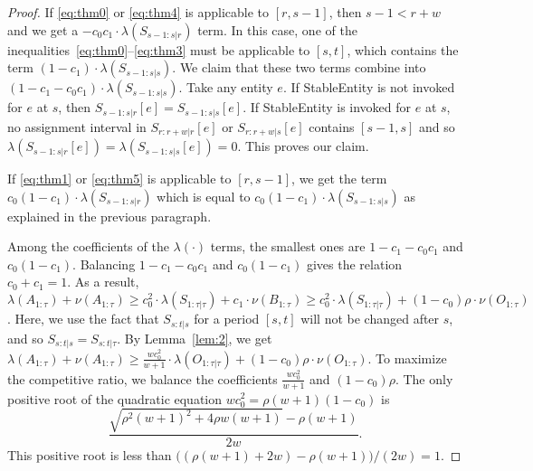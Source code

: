 \documentclass[11pt,a4paper]{article}
\renewcommand{\geq}{\geqslant}
\begin{document}
\begin{proof}
If  \eqref{eq:thm0} or \eqref{eq:thm4} is applicable to $[r,s-1]$, then $s-1 < r+w$ and we get a $-c_0c_1\cdot\lambda(S_{s-1:s|r})$ term.  In this case, one of the inequalities~\eqref{eq:thm0}--\eqref{eq:thm3} must be applicable to $[s,t]$, which contains the term $(1-c_1)\cdot\lambda(S_{s-1:s|s})$.  We claim that these two terms combine into $(1-c_1-c_0c_1)\cdot\lambda(S_{s-1:s|s})$.  Take any entity $e$.  If StableEntity is not invoked for $e$ at $s$, then $S_{s-1:s|r}[e] = S_{s-1:s|s}[e]$.  If StableEntity is invoked for $e$ at $s$, no assignment interval in $S_{r:r+w|r}[e]$ or $S_{r:r+w|s}[e]$ contains $[s-1,s]$ and so $\lambda(S_{s-1:s|r}[e]) = \lambda(S_{s-1:s|s}[e]) = 0$.  This proves our claim.

If  \eqref{eq:thm1} or \eqref{eq:thm5} is applicable to $[r,s-1]$, we get the term $c_0(1-c_1)\cdot \lambda(S_{s-1:s|r})$ which is equal to $c_0(1-c_1)\cdot\lambda(S_{s-1:s|s})$ as explained in the previous paragraph.

Among the coefficients of the $\lambda(\cdot)$ terms, the smallest ones are $1-c_1-c_0c_1$ and $c_0(1-c_1)$.  Balancing $1-c_1-c_0c_1$ and $c_0(1-c_1)$ gives the relation $c_0+c_1 = 1$.   As a result, $\lambda(A_{1:\tau}) + \nu(A_{1:\tau}) \geq c_0^2\cdot\lambda(S_{1:\tau|\tau}) + c_1\cdot\nu(B_{1:\tau}) \geq c_0^2\cdot\lambda(S_{1:\tau|\tau}) + (1-c_0)\rho \cdot \nu(O_{1:\tau})$.  Here, we use the fact that $S_{s:t|s}$ for a period $[s,t]$ will not be changed after $s$, and so $S_{s:t|s} = S_{s:t|\tau}$.  By Lemma~\ref{lem:2}, we get $\lambda(A_{1:\tau}) + \nu(A_{1:\tau}) \geq \frac{wc_0^2}{w+1} \cdot \lambda(O_{1:\tau|\tau}) + (1-c_0)\rho\cdot\nu(O_{1:\tau})$.  To maximize the competitive ratio, we balance the coefficients $\frac{wc_0^2}{w+1}$ and $(1-c_0)\rho$.  The only positive root of the quadratic equation $wc_0^2 = \rho(w+1)(1-c_0)$ is
\[
\frac{\sqrt{\rho^2(w+1)^2 + 4\rho w(w+1)} - \rho(w+1)}{2w}.
\]
This positive root is less than $\bigl((\rho(w+1) + 2w) - \rho(w+1)\bigr)/(2w) = 1$.
\end{proof}


\end{document}
